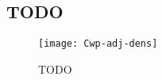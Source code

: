 \subsection{TODO}
\begin{figure}[h]
  \centering
  \texttt{[image: Cwp-adj-dens]}
  \caption{TODO}
  \label{fig:Cwp.adj.dens}
\end{figure}